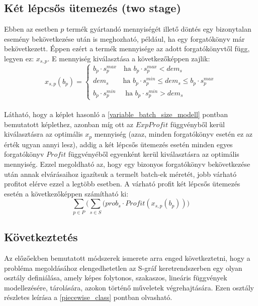 \subsection{Két lépcsős ütemezés (two stage)} \label{TwoStage}
Ebben az esetben $p$ termék gyártandó mennyiségét illető döntés egy bizonytalan esemény bekövetkezése után is meghozható, például, ha egy forgatókönyv már bekövetkezett.
Éppen ezért a termék mennyisége az adott forgatókönyvtől függ, legyen ez: $x_{s,p}$. E mennyiség kiválasztása a következőképpen zajlik:
\begin{equation*}
x_{s,p}(b_p)= \begin{cases}
            b_p \cdot s_p^{max} \quad \text{ha } b_p \cdot s_p^{max}<dem_{s}\\
            dem_{s} \qquad \text{ha } b_p \cdot s_p^{min} \leq dem_{s} \leq b_p \cdot s_p^{max}\\
            b_p \cdot s_p^{min} \quad \text{ ha } b_p \cdot s_p^{min}>dem_{s}
       \end{cases}       
\end{equation*}\\
Látható, hogy a képlet hasonló a \ref{variable_batch_size_modell} pontban bemutatott képlethez, azonban míg ott  az $ExpProfit$ függvényből kerül kiválasztásra az optimális $x_p$ mennyiség (azaz, minden forgatókönyv esetén ez az érték ugyan annyi lesz), addig a két lépcsős ütemezés esetén minden egyes forgatókönyv $Profit$ függvényéből egyenként kerül kiválasztásra az optimális mennyiség.
Ezzel megoldható az, hogy egy bizonyos forgatókönyv bekövetkezése után annak elvárásaihoz igazítsuk a termelt batch-ek méretét, jobb várható profitot elérve ezzel a legtöbb esetben.
A várható profit két lépcsős ütemezés esetén a következőképpen számítható ki:
$$\sum_{p \in P} \bigg( \sum_{s \in S}(prob_s \cdot Profit(x_{s,p}(b_p)) \bigg)$$ 
\subsection{Következtetés} \label{piecewise_suggestion}
Az előzőekben bemutatott módszerek ismerete arra enged következtetni, hogy a probléma megoldásához elengedhetetlen az S-gráf keretrendszerben egy olyan osztály definiálása, amely képes  folytonos, szakaszos, lineáris függvények modellezésére, tárolására, azokon történő műveletek végrehajtására. Ezen osztály részletes leírása a \ref{piecewise_class} pontban olvasható.
